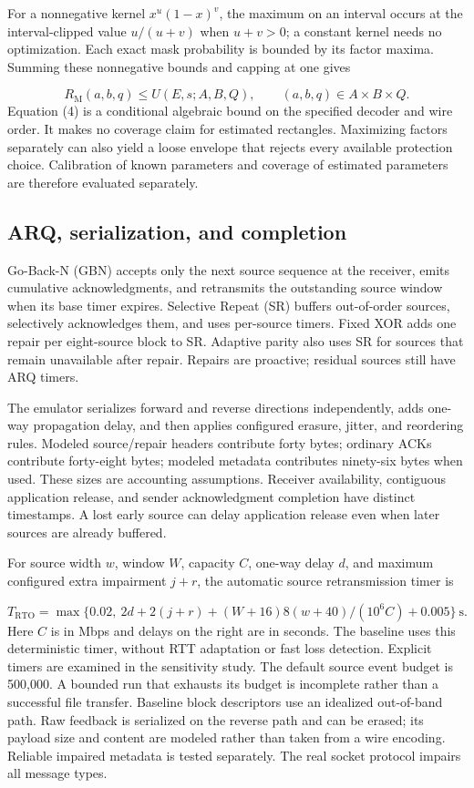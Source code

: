 \documentclass[11pt,a4paper]{article}
\begin{document}
For a nonnegative kernel $x^u(1-x)^v$, the maximum on an interval occurs at the interval-clipped value $u/(u+v)$ when $u+v>0$; a constant kernel needs no optimization. Each exact mask probability is bounded by its factor maxima. Summing these nonnegative bounds and capping at one gives

\[
R_{\mathrm{M}}(a,b,q)\leq U(E,s;A,B,Q),\qquad (a,b,q)\in A\times B\times Q. \tag{4}
\]
Equation (4) is a conditional algebraic bound on the specified decoder and wire order. It makes no coverage claim for estimated rectangles. Maximizing factors separately can also yield a loose envelope that rejects every available protection choice. Calibration of known parameters and coverage of estimated parameters are therefore evaluated separately.

\subsection{ARQ, serialization, and completion}
Go-Back-N (GBN) accepts only the next source sequence at the receiver, emits cumulative acknowledgments, and retransmits the outstanding source window when its base timer expires. Selective Repeat (SR) buffers out-of-order sources, selectively acknowledges them, and uses per-source timers. Fixed XOR adds one repair per eight-source block to SR. Adaptive parity also uses SR for sources that remain unavailable after repair. Repairs are proactive; residual sources still have ARQ timers.

The emulator serializes forward and reverse directions independently, adds one-way propagation delay, and then applies configured erasure, jitter, and reordering rules. Modeled source/repair headers contribute forty bytes; ordinary ACKs contribute forty-eight bytes; modeled metadata contributes ninety-six bytes when used. These sizes are accounting assumptions. Receiver availability, contiguous application release, and sender acknowledgment completion have distinct timestamps. A lost early source can delay application release even when later sources are already buffered.

For source width $w$, window $W$, capacity $C$, one-way delay $d$, and maximum configured extra impairment $j+r$, the automatic source retransmission timer is

\[
T_{\mathrm{RTO}}=\max\{0.02,\ 2d+2(j+r)+(W+16)8(w+40)/(10^6C)+0.005\}\ \mathrm{s}. \tag{5}
\]
Here $C$ is in Mbps and delays on the right are in seconds. The baseline uses this deterministic timer, without RTT adaptation or fast loss detection. Explicit timers are examined in the sensitivity study. The default source event budget is 500,000. A bounded run that exhausts its budget is incomplete rather than a successful file transfer. Baseline block descriptors use an idealized out-of-band path. Raw feedback is serialized on the reverse path and can be erased; its payload size and content are modeled rather than taken from a wire encoding. Reliable impaired metadata is tested separately. The real socket protocol impairs all message types.
\end{document}

